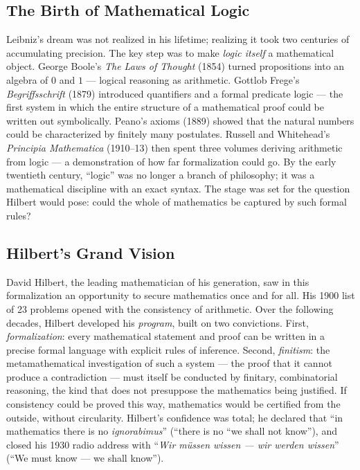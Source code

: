 \subsection{The Birth of Mathematical Logic}
\label{sec:computation:birth_of_logic}

Leibniz's dream was not realized in his lifetime; realizing it took two centuries of accumulating precision. The key step was to make \emph{logic itself} a mathematical object. George Boole's \emph{The Laws of Thought} (1854) turned propositions into an algebra of $0$ and $1$ --- logical reasoning as arithmetic. Gottlob Frege's \emph{Begriffsschrift} (1879) introduced quantifiers and a formal predicate logic --- the first system in which the entire structure of a mathematical proof could be written out symbolically. Peano's axioms (1889) showed that the natural numbers could be characterized by finitely many postulates. Russell and Whitehead's \emph{Principia Mathematica} (1910--13) then spent three volumes deriving arithmetic from logic --- a demonstration of how far formalization could go. By the early twentieth century, ``logic'' was no longer a branch of philosophy; it was a mathematical discipline with an exact syntax. The stage was set for the question Hilbert would pose: could the whole of mathematics be captured by such formal rules?

\subsection{Hilbert's Grand Vision}
\label{sec:computation:hilbert_vision}

David Hilbert, the leading mathematician of his generation, saw in this formalization an opportunity to secure mathematics once and for all. His 1900 list of 23 problems opened with the consistency of arithmetic. Over the following decades, Hilbert developed his \emph{program}, built on two convictions. First, \emph{formalization}: every mathematical statement and proof can be written in a precise formal language with explicit rules of inference. Second, \emph{finitism}: the metamathematical investigation of such a system --- the proof that it cannot produce a contradiction --- must itself be conducted by finitary, combinatorial reasoning, the kind that does not presuppose the mathematics being justified. If consistency could be proved this way, mathematics would be certified from the outside, without circularity. Hilbert's confidence was total; he declared that ``in mathematics there is no \emph{ignorabimus}'' (``there is no ``we shall not know''), and closed his 1930 radio address with ``\emph{Wir m\"ussen wissen --- wir werden wissen}'' (``We must know --- we shall know'').

